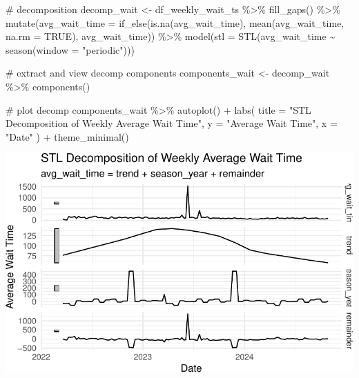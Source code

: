 \documentclass[
  letterpaper,
  DIV=11,
  numbers=noendperiod]{scrartcl}
\newenvironment{Shaded}{\begin{snugshade}}{\end{snugshade}}
\newcommand{\AttributeTok}[1]{\textcolor[rgb]{0.40,0.45,0.13}{#1}}
\newcommand{\CommentTok}[1]{\textcolor[rgb]{0.37,0.37,0.37}{#1}}
\newcommand{\ConstantTok}[1]{\textcolor[rgb]{0.56,0.35,0.01}{#1}}
\newcommand{\FunctionTok}[1]{\textcolor[rgb]{0.28,0.35,0.67}{#1}}
\newcommand{\NormalTok}[1]{\textcolor[rgb]{0.00,0.23,0.31}{#1}}
\newcommand{\OtherTok}[1]{\textcolor[rgb]{0.00,0.23,0.31}{#1}}
\newcommand{\SpecialCharTok}[1]{\textcolor[rgb]{0.37,0.37,0.37}{#1}}
\newcommand{\StringTok}[1]{\textcolor[rgb]{0.13,0.47,0.30}{#1}}
\begin{document}
\begin{Shaded}
\begin{Highlighting}[]
\CommentTok{\# decomposition}
\NormalTok{decomp\_wait }\OtherTok{\textless{}{-}}\NormalTok{ df\_weekly\_wait\_ts }\SpecialCharTok{\%\textgreater{}\%}
  \FunctionTok{fill\_gaps}\NormalTok{() }\SpecialCharTok{\%\textgreater{}\%}
  \FunctionTok{mutate}\NormalTok{(}\AttributeTok{avg\_wait\_time =} \FunctionTok{if\_else}\NormalTok{(}\FunctionTok{is.na}\NormalTok{(avg\_wait\_time), }\FunctionTok{mean}\NormalTok{(avg\_wait\_time, }\AttributeTok{na.rm =} \ConstantTok{TRUE}\NormalTok{), avg\_wait\_time)) }\SpecialCharTok{\%\textgreater{}\%}
  \FunctionTok{model}\NormalTok{(}\AttributeTok{stl =} \FunctionTok{STL}\NormalTok{(avg\_wait\_time }\SpecialCharTok{\textasciitilde{}} \FunctionTok{season}\NormalTok{(}\AttributeTok{window =} \StringTok{"periodic"}\NormalTok{)))}

\CommentTok{\# extract and view decomp components}
\NormalTok{components\_wait }\OtherTok{\textless{}{-}}\NormalTok{ decomp\_wait }\SpecialCharTok{\%\textgreater{}\%}
  \FunctionTok{components}\NormalTok{()}

\CommentTok{\# plot decomp}
\NormalTok{components\_wait }\SpecialCharTok{\%\textgreater{}\%}
  \FunctionTok{autoplot}\NormalTok{() }\SpecialCharTok{+} 
  \FunctionTok{labs}\NormalTok{(}
    \AttributeTok{title =} \StringTok{"STL Decomposition of Weekly Average Wait Time"}\NormalTok{, }
    \AttributeTok{y =} \StringTok{"Average Wait Time"}\NormalTok{, }
    \AttributeTok{x =} \StringTok{"Date"}
\NormalTok{  ) }\SpecialCharTok{+}
  \FunctionTok{theme\_minimal}\NormalTok{()}
\end{Highlighting}
\end{Shaded}

\includegraphics{final_proj_group1_files/figure-pdf/unnamed-chunk-3-3.pdf}
\end{document}
